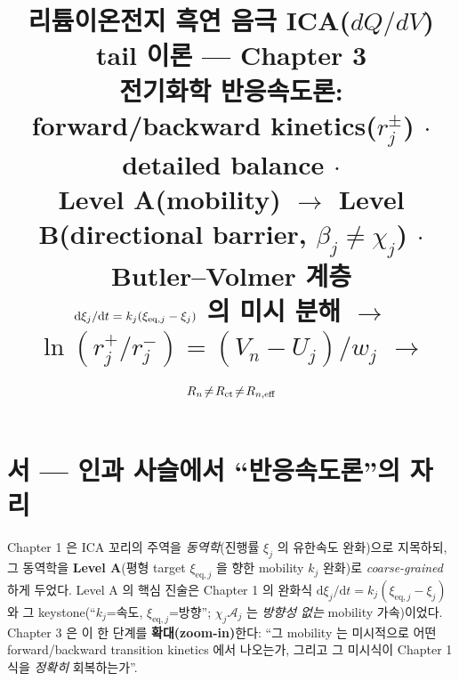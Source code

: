 \documentclass[11pt,a4paper]{article}
\title{\textbf{리튬이온전지 흑연 음극 ICA($dQ/dV$) tail 이론 — Chapter 3}\\[0.4em]
\large 전기화학 반응속도론: forward/backward kinetics($r_j^\pm$) $\cdot$ detailed balance $\cdot$\\
Level A(mobility) $\to$ Level B(directional barrier, $\beta_j\ne\chi_j$) $\cdot$ Butler--Volmer 계층\\[0.2em]
\normalsize $\dd\xi_j/\dd t=k_j(\xi_{\eq,j}-\xi_j)$ 의 미시 분해 $\to$ $\ln(r_j^+/r_j^-)=(V_n-U_j)/w_j$ $\to$ $R_n\!\ne\!R_{\mathrm{ct}}\!\ne\!R_{n,\mathrm{eff}}$}
\author{}
\date{}
\newcommand{\dd}{\mathrm{d}}
\newcommand{\eq}{\mathrm{eq}}
\begin{document}
\sloppy
\maketitle

\section*{서 — 인과 사슬에서 ``반응속도론''의 자리}
Chapter 1 은 ICA 꼬리의 주역을 \emph{동역학}(진행률 $\xi_j$ 의 유한속도 완화)으로 지목하되, 그 동역학을
\textbf{Level A}(평형 target $\xi_{\eq,j}$ 을 향한 mobility $k_j$ 완화)로 \emph{coarse-grained} 하게 두었다.
Level A 의 핵심 진술은 Chapter 1 의 완화식 $\dd\xi_j/\dd t=k_j(\xi_{\eq,j}-\xi_j)$ 와 그 keystone(``$k_j$=속도,
$\xi_{\eq,j}$=방향''; $\chi_j\mathcal A_j$ 는 \emph{방향성 없는} mobility 가속)이었다. Chapter 3 은 이 한 단계를
\textbf{확대(zoom-in)}한다: ``그 mobility 는 미시적으로 어떤 forward/backward transition kinetics 에서
나오는가, 그리고 그 미시식이 Chapter 1 식을 \emph{정확히} 회복하는가''.
\end{document}
